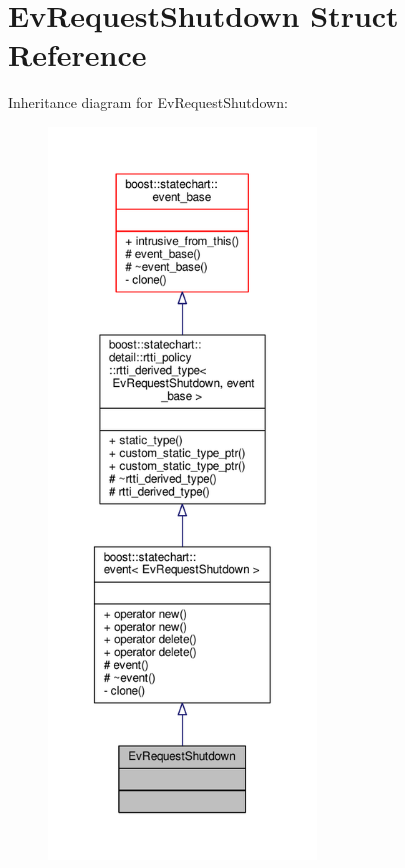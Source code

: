 \hypertarget{struct_ev_request_shutdown}{}\section{Ev\+Request\+Shutdown Struct Reference}
\label{struct_ev_request_shutdown}


Inheritance diagram for Ev\+Request\+Shutdown\+:
\nopagebreak
\begin{figure}[H]
\begin{center}
\leavevmode
\includegraphics[height=550pt]{struct_ev_request_shutdown__inherit__graph}
\end{center}
\end{figure}


